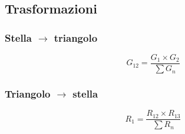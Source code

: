 \documentclass[10pt]{article}
\begin{document}
    \hspace{-.6cm} %
    \begin{minipage}[t]{.3\textwidth}

        \subsection*{Trasformazioni}
            \vspace{-.2cm}

            \subsubsection*{Stella \(\rightarrow\) triangolo}

                \[
                    G_{12} = \frac{G_1 \times G_2}{\sum G_n}
                \]

            \subsubsection*{Triangolo \(\rightarrow\) stella}

                \[
                    R_1 = \frac{R_{12} \times R_{13}}{\sum R_n}
                \]

    \end{minipage}
    \hfill
\end{document}
